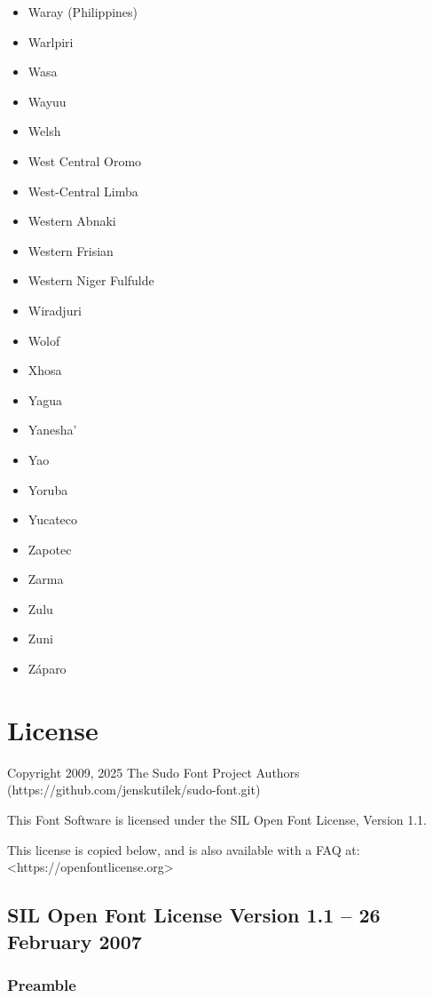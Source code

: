 \documentclass[paper=a4, 12pt]{scrbook}
\begin{document}
\begin{multicols}{3}
\begin{itemize}
        \item Waray (Philippines)
        \item Warlpiri
        \item Wasa
        \item Wayuu
        \item Welsh
        \item West Central Oromo
        \item West-Central Limba
        \item Western Abnaki
        \item Western Frisian
        \item Western Niger Fulfulde
        \item Wiradjuri
        \item Wolof
        \item Xhosa
        \item Yagua
        \item Yanesha’
        \item Yao
        \item Yoruba
        \item Yucateco
        \item Zapotec
        \item Zarma
        \item Zulu
        \item Zuni
        \item Záparo
    \end{itemize}
\end{multicols}

\chapter{License}

Copyright 2009, 2025 The Sudo Font Project Authors (https://github.com/jenskutilek/sudo-font.git)

This Font Software is licensed under the SIL Open Font License, Version 1.1.

This license is copied below, and is also available with a FAQ at: <https://openfontlicense.org>


\section{SIL Open Font License Version 1.1 – 26 February 2007}

\subsection{Preamble}
\end{document}
